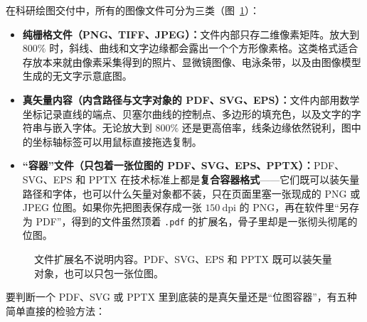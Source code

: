在科研绘图交付中，所有的图像文件可分为三类（图~\ref{fig:ch13-04}）：
\begin{itemize}
\item \textbf{纯栅格文件（PNG、TIFF、JPEG）：}文件内部只存二维像素矩阵。放大到 $800\%$ 时，斜线、曲线和文字边缘都会露出一个个方形像素格。这类格式适合存放本来就由像素采集得到的照片、显微镜图像、电泳条带，以及由图像模型生成的无文字示意底图。
\item \textbf{真矢量内容（内含路径与文字对象的 PDF、SVG、EPS）：}文件内部用数学坐标记录直线的端点、贝塞尔曲线的控制点、多边形的填充色，以及文字的字符串与嵌入字体。无论放大到 $800\%$ 还是更高倍率，线条边缘依然锐利，图中的坐标轴标签可以用鼠标直接拖选复制。
\item \textbf{“容器”文件（只包着一张位图的 PDF、SVG、EPS、PPTX）：}PDF、SVG、EPS 和 PPTX 在技术标准上都是\textbf{复合容器格式}——它们既可以装矢量路径和字体，也可以什么矢量对象都不装，只在页面里塞一张现成的 PNG 或 JPEG 位图。如果你先把图表保存成一张 $150\ \text{dpi}$ 的 PNG，再在软件里“另存为 PDF”，得到的文件虽然顶着 \texttt{.pdf} 的扩展名，骨子里却是一张彻头彻尾的位图。
\end{itemize}

\begin{figure}[htbp]\centering
\resizebox{\linewidth}{!}{}
\caption{文件扩展名不说明内容。PDF、SVG、EPS 和 PPTX 既可以装矢量对象，也可以只包一张位图。}\label{fig:ch13-04}
\end{figure}

要判断一个 PDF、SVG 或 PPTX 里到底装的是真矢量还是“位图容器”，有五种简单直接的检验方法：


